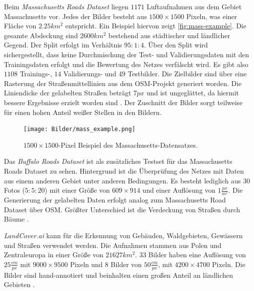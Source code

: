 Beim \textit{Massachusetts Roads Dataset} liegen $1171$ Luftaufnahmen aus dem Gebiet Massachusetts vor.
Jedes der Bilder besteht aus $1500{\times}1500$ Pixeln, was einer Fläche von $2.25 km^2$ entspricht.
Ein Beispiel hiervon zeigt \autoref{fig:mass-example}.
Die gesamte Abdeckung sind $2600 km^2$ bestehend aus städtischer und ländlicher Gegend.
Der Split erfolgt im Verhältnis $95:1:4$. 
Über den Split wird sichergestellt, dass keine Durchmischung der Test- und Validierungsdaten mit den Trainingsdaten erfolgt und die Bewertung des Netzes verfälscht wird.
Es gibt also $1108$ Trainings-, $14$ Validierungs- und $49$ Testbilder.
Die Zielbilder sind über eine Rasterung der Straßenmittellinien aus dem \ac{OSM}-Projekt generiert worden.
Die Liniendicke der gelabelten Straßen beträgt $7 px$ und ist ungeglättet, da hiermit bessere Ergebnisse erzielt worden sind \cite{Mnih.2013}.
Der Zuschnitt der Bilder sorgt teilweise für einen hohen Anteil weißer Stellen in den Bildern.

\begin{figure}
	\centering
	\vspace{-20pt} %
	\texttt{[image: Bilder/mass\_example.png]}
	\vspace{-5pt}
	\caption[$1500{\times}1500$-Pixel Beispiel des Massachusetts-Datensatzes.]{\unskip}
	$1500{\times}1500$-Pixel Beispiel des Massachusetts-Datensatzes.
	\label{fig:mass-example}
\end{figure}

Das \textit{Buffalo Roads Dataset} ist als zusätzliches Testset für das Massachusetts Roads Dataset zu sehen.
Hintergrund ist die Überprüfung des Netzes mit Daten aus einem anderen Gebiet unter anderen Bedingungen.
Es besteht lediglich aus 30 Fotos ($5:5:20$) mit einer Größe von $609{\times}914$ und einer Auflösung von $1 \frac{px}{m^2}$.
Die Generierung der gelabelten Daten erfolgt analog zum Massachusetts Road Dataset über \ac{OSM}.
Größter Unterschied ist die Verdeckung von Straßen durch Bäume \cite{Mnih.2013}.

\textit{LandCover.ai} kann für die Erkennung von Gebäuden, Waldgebieten, Gewässern und Straßen verwendet werden.
Die Aufnahmen stammen aus Polen und Zentraleuropa in einer Größe von $21627 km^2$.
$33$ Bilder haben eine Auflösung von $25 \frac{cm}{px}$ mit $9000{\times}9500$ Pixeln und 
$8$ Bilder von $50 \frac{cm}{px}$, mit $4200{\times}4700$ Pixeln.
Die Bilder sind hand-annotiert und beinhalten einen großen Anteil an ländlichen Gebieten \cite{.20.04.2022}.

